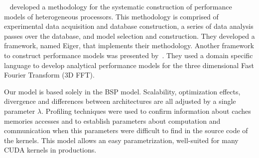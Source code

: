 ~\cite{Kerr:2012:Eiger} developed a methodology for the systematic construction of performance models of heterogeneous processors. This methodology is comprised of experimental data acquisition and database construction, a series of data analysis passes over the database, and model selection and construction. They developed a framework, named Eiger, that implements their methodology. Another framework to construct performance models was presented by~\cite{Spafford:2012:Aspen}. They used a domain specific language to develop analytical performance models for the three dimensional Fast Fourier Transform (3D FFT).  

Our model is based solely in the BSP model. Scalability, optimization effects, divergence and differences between architectures are all adjusted by a single parameter $\lambda$. Profiling techniques were used to confirm information about caches memories accesses and to establish parameters about computation and communication when this parameters were difficult to find in the source code of the kernels. This model allows an easy parametrization, well-suited for many CUDA kernels in productions.
